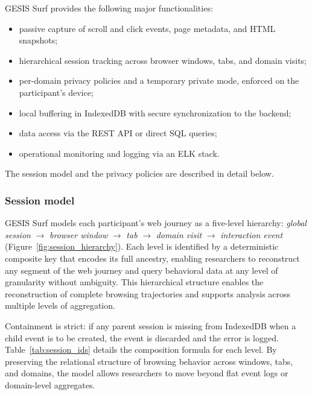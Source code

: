 \documentclass[preprint,12pt,a4paper]{elsarticle}
\begin{document}
GESIS Surf provides the following major functionalities:
\begin{itemize}
    \item passive capture of scroll and click events, page metadata, and HTML snapshots;
    \item hierarchical session tracking across browser windows, tabs, and domain visits;
    \item per-domain privacy policies and a temporary private mode, enforced on the participant's device;
    \item local buffering in IndexedDB with secure synchronization to the backend;
    \item data access via the REST API or direct SQL queries;
    \item operational monitoring and logging via an ELK stack.
\end{itemize}
The session model and the privacy policies are described in detail below.

  \subsubsection{Session model}

  GESIS Surf models each participant's web journey as a five-level hierarchy: \emph{global session} $\rightarrow$ \emph{browser window} $\rightarrow$ \emph{tab} $\rightarrow$ \emph{domain visit} $\rightarrow$ \emph{interaction event} (Figure~\ref{fig:session_hierarchy}). Each level is identified by a deterministic composite key that encodes its full ancestry, enabling researchers to reconstruct any segment of the web journey and query behavioral data at any level of granularity without ambiguity. This hierarchical structure enables the reconstruction of complete browsing trajectories and supports analysis across multiple levels of aggregation.

  Containment is strict: if any parent session is missing from IndexedDB when a child event is to be created, the event is discarded and the error is logged. Table~\ref{tab:session_ids} details the composition formula for each level. By preserving the relational structure of browsing behavior across windows, tabs, and domains, the model allows researchers to move beyond flat event logs or domain-level aggregates.
\end{document}
